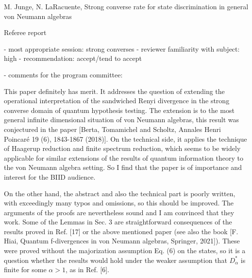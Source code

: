 \documentclass[12pt]{article}
\begin{document}
\begin{center}
{\large M. Junge, N. LaRacuente, Strong converse rate for state discrimination in
general von Neumann algebras }

\end{center}
\medskip

\centerline{Referee report}

\bigskip

- most appropriate session: strong converses
- reviewer familiarity with subject: high    
- recommendation: accept/tend to accept

- comments for the program committee: 

This paper definitely has merit. It addresses the
question of extending the operational interpretation of the sandwiched Renyi divergence in
the strong converse domain of quantum hypothesis testing. The extension is to the most
general infinite dimensional situation of von Neumann algebras, this result was conjectured in
the paper [Berta, Tomamichel and Scholtz, Annales Henri Poincaré 19 (6), 1843-1867
(2018)]. On the technical side, it applies the technique of Haagerup reduction and finite
spectrum reduction, which seems to be widely applicable for similar extensions of the
results of quantum information theory to the von Neumann algebra setting. So I find that
the paper is of importance and interest for the BIID audience.

On the other hand, the abstract and also the technical part is poorly written, with
exceedingly many typos and omissions, so this should be improved. The arguments of the
proofs are nevertheless sound and I am convinced that they work. Some of the Lemmas in Sec. 3 are straightforward
consequences of the results proved in  Ref. [17] or the above mentioned paper (see also
the book [F. Hiai, Quantum f-divergences in von Neumann algebras, Springer, 2021]). These
were proved without the majorization assumption Eq. (6) on the states, so it is a question
whether the results would hold under the weaker assumption that $D^*_\alpha$ is finite for
some $\alpha>1$, as in Ref. [6].
\end{document}
